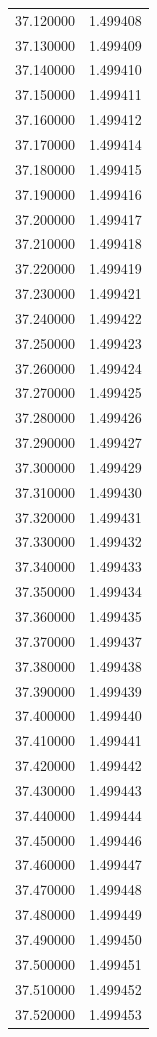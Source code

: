 \begin{tabular}{rr}
37.120000 & 1.499408 \\
37.130000 & 1.499409 \\
37.140000 & 1.499410 \\
37.150000 & 1.499411 \\
37.160000 & 1.499412 \\
37.170000 & 1.499414 \\
37.180000 & 1.499415 \\
37.190000 & 1.499416 \\
37.200000 & 1.499417 \\
37.210000 & 1.499418 \\
37.220000 & 1.499419 \\
37.230000 & 1.499421 \\
37.240000 & 1.499422 \\
37.250000 & 1.499423 \\
37.260000 & 1.499424 \\
37.270000 & 1.499425 \\
37.280000 & 1.499426 \\
37.290000 & 1.499427 \\
37.300000 & 1.499429 \\
37.310000 & 1.499430 \\
37.320000 & 1.499431 \\
37.330000 & 1.499432 \\
37.340000 & 1.499433 \\
37.350000 & 1.499434 \\
37.360000 & 1.499435 \\
37.370000 & 1.499437 \\
37.380000 & 1.499438 \\
37.390000 & 1.499439 \\
37.400000 & 1.499440 \\
37.410000 & 1.499441 \\
37.420000 & 1.499442 \\
37.430000 & 1.499443 \\
37.440000 & 1.499444 \\
37.450000 & 1.499446 \\
37.460000 & 1.499447 \\
37.470000 & 1.499448 \\
37.480000 & 1.499449 \\
37.490000 & 1.499450 \\
37.500000 & 1.499451 \\
37.510000 & 1.499452 \\
37.520000 & 1.499453 \\

\end{tabular}
